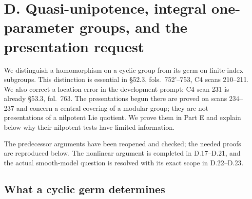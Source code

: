 \section{D. Quasi-unipotence, integral one-parameter groups, and the presentation request}
\label{sec:D}

We distinguish a homomorphism on a cyclic group from its germ on finite-index
subgroups.  This distinction is essential in \S52.3, fols.~752'--753,
C4 scans 210--211.  We also correct a location error in the development
prompt: C4 scan 231 is already \S53.3, fol.~763.  The presentations begun
there are proved on scans 234--237 and concern a central covering of a
modular group; they are not presentations of a nilpotent Lie quotient.
We prove them in Part E and explain below why their nilpotent tests have
limited information.

The predecessor arguments \citep[Part E, E.3, E.6, E.10--E.11]{LM1Return2026}
have been reopened and checked; the needed proofs are reproduced below.
The nonlinear argument is completed in D.17--D.21, and the actual
smooth-model question is resolved with its exact scope in D.22--D.23.

\subsection{What a cyclic germ determines}

